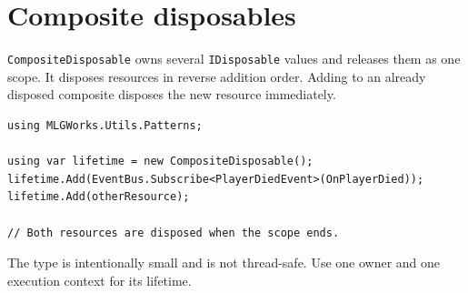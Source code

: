 \section{Composite disposables}
\label{sec:composite-disposable}

\texttt{CompositeDisposable} owns several \texttt{IDisposable} values and releases them as one scope. It disposes resources in reverse addition order. Adding to an already disposed composite disposes the new resource immediately.

\begin{lstlisting}
using MLGWorks.Utils.Patterns;

using var lifetime = new CompositeDisposable();
lifetime.Add(EventBus.Subscribe<PlayerDiedEvent>(OnPlayerDied));
lifetime.Add(otherResource);

// Both resources are disposed when the scope ends.
\end{lstlisting}

The type is intentionally small and is not thread-safe. Use one owner and one execution context for its lifetime.
